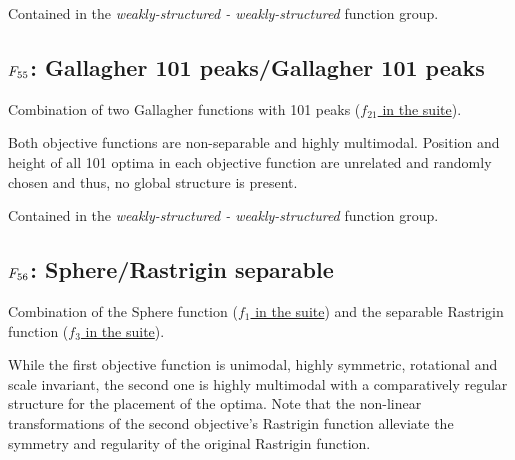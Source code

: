 Contained in the \emph{weakly-structured - weakly-structured} function group.



\subsection[\texorpdfstring{\protect\(F_{55}\protect\): Gallagher 101 peaks/Gallagher 101 peaks}{F55: Gallagher 101 peaks/Gallagher 101 peaks}]{\texorpdfstring{\protect\(F_{55}\protect\): Gallagher 101 peaks/Gallagher 101 peaks}{}}
\label{index:gallagher-101-peaks-gallagher-101-peaks}\label{index:f55}
Combination of two Gallagher functions with
101 peaks (\href{https://coco.gforge.inria.fr/downloads/download16.00/bbobdocfunctions.pdf\#page=105}{\(f_{21}\) in the \bbob suite}).

Both objective functions are non-separable and highly multimodal.
Position and height of all 101 optima in each objective function
are unrelated and randomly chosen and thus, no global structure
is present.

Contained in the \emph{weakly-structured - weakly-structured} function group.



\subsection[\texorpdfstring{\protect\(F_{56}\protect\): Sphere/Rastrigin separable}{F56: Sphere/Rastrigin separable}]{\texorpdfstring{\protect\(F_{56}\protect\): Sphere/Rastrigin separable}{}}
\label{index:f56}\label{index:sphere-rastrigin-separable}
Combination of the Sphere function (\href{https://coco.gforge.inria.fr/downloads/download16.00/bbobdocfunctions.pdf\#page=5}{\(f_1\) in the \bbob suite}) and the
separable Rastrigin function (\href{https://coco.gforge.inria.fr/downloads/download16.00/bbobdocfunctions.pdf\#page=15}{\(f_3\) in the \bbob suite}).

While the first objective function is unimodal, highly symmetric,
rotational and scale invariant, the second one is highly multimodal
with a comparatively regular structure for the placement of the optima.
Note that the non-linear transformations of the second objective's
Rastrigin function alleviate the symmetry and regularity of the
original Rastrigin function.

